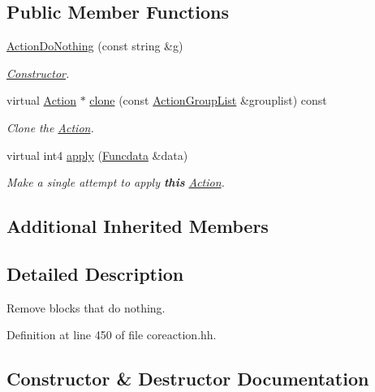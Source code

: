 \subsection*{Public Member Functions}
\begin{DoxyCompactItemize}
\item 
\mbox{\hyperlink{class_action_do_nothing_a1f866188d3a74f84764b048fae827a48}{Action\+Do\+Nothing}} (const string \&g)
\begin{DoxyCompactList}\small\item\em \mbox{\hyperlink{class_constructor}{Constructor}}. \end{DoxyCompactList}\item 
virtual \mbox{\hyperlink{class_action}{Action}} $\ast$ \mbox{\hyperlink{class_action_do_nothing_abe01dd8198e672a33f3a9fec28376284}{clone}} (const \mbox{\hyperlink{class_action_group_list}{Action\+Group\+List}} \&grouplist) const
\begin{DoxyCompactList}\small\item\em Clone the \mbox{\hyperlink{class_action}{Action}}. \end{DoxyCompactList}\item 
virtual int4 \mbox{\hyperlink{class_action_do_nothing_a731f2fd0ba173c40a794de849bfabe4b}{apply}} (\mbox{\hyperlink{class_funcdata}{Funcdata}} \&data)
\begin{DoxyCompactList}\small\item\em Make a single attempt to apply {\bfseries{this}} \mbox{\hyperlink{class_action}{Action}}. \end{DoxyCompactList}\end{DoxyCompactItemize}
\subsection*{Additional Inherited Members}


\subsection{Detailed Description}
Remove blocks that do nothing. 

Definition at line 450 of file coreaction.\+hh.



\subsection{Constructor \& Destructor Documentation}
\mbox{\label{class_action_do_nothing_a1f866188d3a74f84764b048fae827a48}} 
